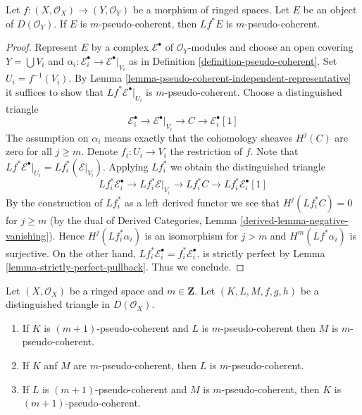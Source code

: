 \begin{lemma}
\label{lemma-pseudo-coherent-pullback}
Let $f : (X, \mathcal{O}_X) \to (Y, \mathcal{O}_Y)$
be a morphism of ringed spaces. Let $E$ be an object of
$D(\mathcal{O}_Y)$. If $E$ is $m$-pseudo-coherent,
then $Lf^*E$ is $m$-pseudo-coherent.
\end{lemma}

\begin{proof}
Represent $E$ by a complex $\mathcal{E}^\bullet$ of $\mathcal{O}_Y$-modules
and choose an open covering $Y = \bigcup V_i$ and
$\alpha_i : \mathcal{E}_i^\bullet \to \mathcal{E}^\bullet|_{V_i}$
as in Definition \ref{definition-pseudo-coherent}.
Set $U_i = f^{-1}(V_i)$.
By Lemma \ref{lemma-pseudo-coherent-independent-representative}
it suffices to show that $Lf^*\mathcal{E}^\bullet|_{U_i}$ is
$m$-pseudo-coherent.
Choose a distinguished triangle
$$
\mathcal{E}_i^\bullet \to
\mathcal{E}^\bullet|_{V_i} \to
C \to
\mathcal{E}_i^\bullet[1]
$$
The assumption on $\alpha_i$ means exactly that the cohomology sheaves
$H^j(C)$ are zero for all $j \geq m$. Denote $f_i : U_i \to V_i$
the restriction of $f$. Note that $Lf^*\mathcal{E}^\bullet|_{U_i} = 
Lf_i^*(\mathcal{E}|_{V_i})$. Applying $Lf_i^*$ we obtain
the distinguished triangle
$$
Lf_i^*\mathcal{E}_i^\bullet \to
Lf_i^*\mathcal{E}|_{V_i} \to
Lf_i^*C \to
Lf_i^*\mathcal{E}_i^\bullet[1]
$$
By the construction of $Lf_i^*$ as a left derived functor we see that
$H^j(Lf_i^*C) = 0$ for $j \geq m$ (by the dual of Derived Categories, Lemma
\ref{derived-lemma-negative-vanishing}). Hence $H^j(Lf_i^*\alpha_i)$ is an
isomorphism for $j > m$ and $H^m(Lf^*\alpha_i)$ is surjective.
On the other hand,
$Lf_i^*\mathcal{E}_i^\bullet = f_i^*\mathcal{E}_i^\bullet$.
is strictly perfect by Lemma \ref{lemma-strictly-perfect-pullback}.
Thus we conclude.
\end{proof}

\begin{lemma}
\label{lemma-cone-pseudo-coherent}
Let $(X, \mathcal{O}_X)$ be a ringed space and $m \in \mathbf{Z}$.
Let $(K, L, M, f, g, h)$ be a distinguished triangle in $D(\mathcal{O}_X)$.
\begin{enumerate}
\item If $K$ is $(m + 1)$-pseudo-coherent and $L$ is $m$-pseudo-coherent
then $M$ is $m$-pseudo-coherent.
\item If $K$ anf $M$ are $m$-pseudo-coherent, then $L$ is $m$-pseudo-coherent.
\item If $L$ is $(m + 1)$-pseudo-coherent and $M$
is $m$-pseudo-coherent, then $K$ is $(m + 1)$-pseudo-coherent.
\end{enumerate}
\end{lemma}

